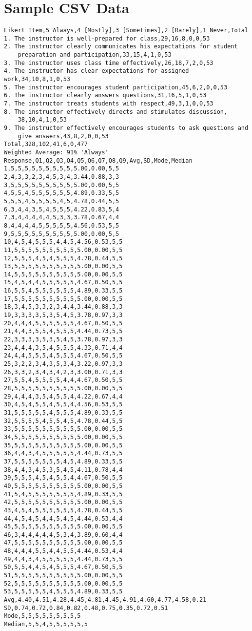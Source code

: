 
\chapter{Sample CSV Data}
\label{chap:appendix1}
\begin{doublespace}
\begin{lstlisting}
Likert Item,5 Always,4 [Mostly],3 [Sometimes],2 [Rarely],1 Never,Total
1. The instructor is well-prepared for class,29,16,8,0,0,53
2. The instructor clearly communicates his expectations for student 
    preparation and participation,33,15,4,1,0,53
3. The instructor uses class time effectively,26,18,7,2,0,53
4. The instructor has clear expectations for assigned work,34,10,8,1,0,53
5. The instructor encourages student participation,45,6,2,0,0,53
6. The instructor clearly answers questions,31,16,5,1,0,53
7. The instructor treats students with respect,49,3,1,0,0,53
8. The instructor effectively directs and stimulates discussion,
    38,10,4,1,0,53
9. The instructor effectively encourages students to ask questions and 
    give answers,43,8,2,0,0,53
Total,328,102,41,6,0,477
Weighted Average: 91% 'Always'
Response,Q1,Q2,Q3,Q4,Q5,Q6,Q7,Q8,Q9,Avg,SD,Mode,Median
1,5,5,5,5,5,5,5,5,5,5.00,0.00,5,5
2,4,3,3,2,3,4,5,3,4,3.44,0.88,3,3
3,5,5,5,5,5,5,5,5,5,5.00,0.00,5,5
4,5,5,4,5,5,5,5,5,5,4.89,0.33,5,5
5,5,5,4,5,5,5,5,4,5,4.78,0.44,5,5
6,3,4,4,3,5,4,5,5,5,4.22,0.83,5,4
7,3,4,4,4,4,4,5,3,3,3.78,0.67,4,4
8,4,4,4,4,5,5,5,5,5,4.56,0.53,5,5
9,5,5,5,5,5,5,5,5,5,5.00,0.00,5,5
10,4,5,4,5,5,5,4,4,5,4.56,0.53,5,5
11,5,5,5,5,5,5,5,5,5,5.00,0.00,5,5
12,5,5,5,4,5,4,5,5,5,4.78,0.44,5,5
13,5,5,5,5,5,5,5,5,5,5.00,0.00,5,5
14,5,5,5,5,5,5,5,5,5,5.00,0.00,5,5
15,4,5,4,4,5,5,5,5,5,4.67,0.50,5,5
16,5,5,4,5,5,5,5,5,5,4.89,0.33,5,5
17,5,5,5,5,5,5,5,5,5,5.00,0.00,5,5
18,3,4,5,3,3,2,3,4,4,3.44,0.88,3,3
19,3,3,3,3,5,3,5,4,5,3.78,0.97,3,3
20,4,4,4,5,5,5,5,5,5,4.67,0.50,5,5
21,4,4,3,5,5,4,5,5,5,4.44,0.73,5,5
22,3,3,3,3,5,3,5,4,5,3.78,0.97,3,3
23,4,4,4,3,5,4,5,5,5,4.33,0.71,4,4
24,4,4,5,5,5,4,5,5,5,4.67,0.50,5,5
25,3,2,2,3,4,3,5,3,4,3.22,0.97,3,3
26,3,3,2,3,4,3,4,2,3,3.00,0.71,3,3
27,5,5,4,5,5,5,5,4,4,4.67,0.50,5,5
28,5,5,5,5,5,5,5,5,5,5.00,0.00,5,5
29,4,4,4,3,5,4,5,5,4,4.22,0.67,4,4
30,4,5,4,5,5,4,5,5,4,4.56,0.53,5,5
31,5,5,5,5,5,4,5,5,5,4.89,0.33,5,5
32,5,5,5,5,4,5,5,4,5,4.78,0.44,5,5
33,5,5,5,5,5,5,5,5,5,5.00,0.00,5,5
34,5,5,5,5,5,5,5,5,5,5.00,0.00,5,5
35,5,5,5,5,5,5,5,5,5,5.00,0.00,5,5
36,4,4,3,4,5,5,5,5,5,4.44,0.73,5,5
37,5,5,5,5,5,5,5,4,5,4.89,0.33,5,5
38,4,4,3,4,5,3,5,4,5,4.11,0.78,4,4
39,5,5,5,4,5,4,5,5,4,4.67,0.50,5,5
40,5,5,5,5,5,5,5,5,5,5.00,0.00,5,5
41,5,4,5,5,5,5,5,5,5,4.89,0.33,5,5
42,5,5,5,5,5,5,5,5,5,5.00,0.00,5,5
43,4,5,4,5,5,5,5,5,5,4.78,0.44,5,5
44,4,5,4,5,4,4,5,4,5,4.44,0.53,4,4
45,5,5,5,5,5,5,5,5,5,5.00,0.00,5,5
46,3,4,4,4,4,4,5,3,4,3.89,0.60,4,4
47,5,5,5,5,5,5,5,5,5,5.00,0.00,5,5
48,4,4,4,5,5,4,4,5,5,4.44,0.53,4,4
49,4,4,3,4,5,5,5,5,5,4.44,0.73,5,5
50,5,5,4,4,5,4,5,5,5,4.67,0.50,5,5
51,5,5,5,5,5,5,5,5,5,5.00,0.00,5,5
52,5,5,5,5,5,5,5,5,5,5.00,0.00,5,5
53,5,5,5,5,5,4,5,5,5,4.89,0.33,5,5
Avg,4.40,4.51,4.28,4.45,4.81,4.45,4.91,4.60,4.77,4.58,0.21
SD,0.74,0.72,0.84,0.82,0.48,0.75,0.35,0.72,0.51
Mode,5,5,5,5,5,5,5,5,5
Median,5,5,4,5,5,5,5,5,5
\end{lstlisting}
\end{doublespace}
